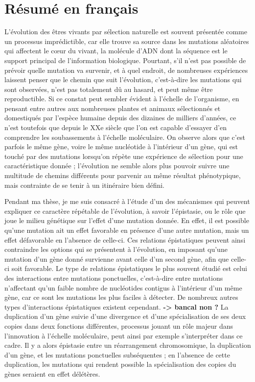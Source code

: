
\chapter{Résumé en français}

L'évolution des êtres vivants par sélection naturelle est souvent présentée comme un processus imprédictible, car elle trouve sa source dans les mutations aléatoires qui affectent le cœur du vivant, la molécule d'ADN dont la séquence est le support principal de l'information biologique.
Pourtant, s'il n'est pas possible de prévoir quelle mutation va survenir, et à quel endroit, de nombreuses expériences laissent penser que le chemin que suit l'évolution, c'est-à-dire les mutations qui sont observées, n'est pas totalement dû au hasard, et peut même être reproductible.
Si ce constat peut sembler évident à l'échelle de l'organisme, en pensant entre autres aux nombreuses plantes et animaux sélectionnés et domestiqués par l'espèce humaine depuis des dizaines de milliers d'années, ce n'est toutefois que depuis le XXe siècle que l'on est capable d'essayer d'en comprendre les soubassements à l'échelle moléculaire.
On observe alors que c'est parfois le même gène, voire le même nucléotide à l'intérieur d'un gène, qui est touché par des mutations lorsqu'on répète une expérience de sélection pour une caractéristique donnée ; l'évolution ne semble alors plus pouvoir suivre une multitude de chemins différents pour parvenir au même résultat phénotypique, mais contrainte de se tenir à un itinéraire bien défini.

Pendant ma thèse, je me suis consacré à l'étude d'un des mécanismes qui peuvent expliquer ce caractère répétable de l'évolution, à savoir l'épistasie, ou le rôle que joue le milieu génétique sur l'effet d'une mutation donnée.
En effet, il est possible qu'une mutation ait un effet favorable en présence d'une autre mutation, mais un effet défavorable en l'absence de celle-ci.
Ces relations épistatiques peuvent ainsi contraindre les options qui se présentent à l'évolution, en imposant qu'une mutation d'un gène donné survienne avant celle d'un second gène, afin que celle-ci soit favorable.
Le type de relations épistatiques le plus souvent étudié est celui des interactions entre mutations ponctuelles, c'est-à-dire entre mutations n'affectant qu'un faible nombre de nucléotides contigus à l'intérieur d'un même gène, car ce sont les mutations les plus faciles à détecter.
De nombreux autres types d'interactions épistatiques existent cependant. \textbf{-> bancal non ?}
La duplication d'un gène suivie d'une divergence et d'une spécialisation de ses deux copies dans deux fonctions différentes, processus jouant un rôle majeur dans l'innovation à l'échelle moléculaire, peut ainsi par exemple s'interpréter dans ce cadre.
Il y a alors épistasie entre un réarrangement chromosomique, la duplication d'un gène, et les mutations ponctuelles subséquentes ; en l'absence de cette duplication, les mutations qui rendent possible la spécialisation des copies du gènes seraient en effet délétères.

